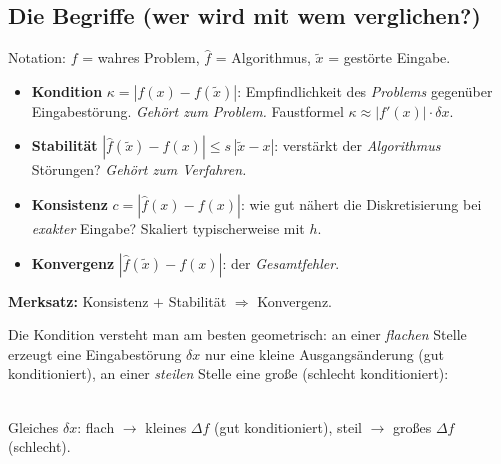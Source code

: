 \documentclass[a4paper,11pt]{article}
\begin{document}
\subsection{Die Begriffe (wer wird mit wem verglichen?)}
Notation: $f$ = wahres Problem, $\hat f$ = Algorithmus, $\tilde x$ = gestörte Eingabe.
\begin{itemize}
\item \textbf{Kondition} $\kappa=|f(x)-f(\tilde x)|$: Empfindlichkeit des \emph{Problems} gegenüber
  Eingabestörung. \emph{Gehört zum Problem.} Faustformel $\kappa\approx|f'(x)|\cdot\delta x$.
\item \textbf{Stabilität} $|\hat f(\tilde x)-\hat f(x)|\le s\,|\tilde x-x|$: verstärkt der
  \emph{Algorithmus} Störungen? \emph{Gehört zum Verfahren.}
\item \textbf{Konsistenz} $c=|\hat f(x)-f(x)|$: wie gut nähert die Diskretisierung bei
  \emph{exakter} Eingabe? Skaliert typischerweise mit $h$.
\item \textbf{Konvergenz} $|\hat f(\tilde x)-f(x)|$: der \emph{Gesamtfehler}.
\end{itemize}
\textbf{Merksatz:} Konsistenz $+$ Stabilität $\Rightarrow$ Konvergenz.

Die Kondition versteht man am besten geometrisch: an einer \emph{flachen} Stelle erzeugt eine
Eingabestörung $\delta x$ nur eine kleine Ausgangsänderung (gut konditioniert), an einer
\emph{steilen} Stelle eine große (schlecht konditioniert):

\begin{center}
\\[-2pt]
{\footnotesize\color{muted}Gleiches $\delta x$: flach $\to$ kleines $\Delta f$ (gut konditioniert), steil $\to$ großes $\Delta f$ (schlecht).}
\end{center}
\end{document}

